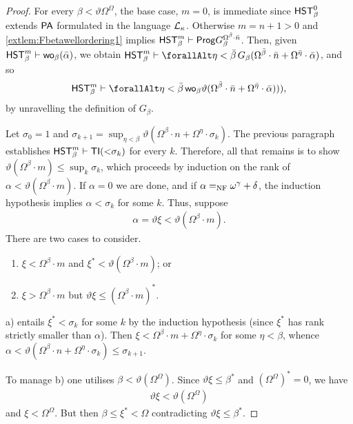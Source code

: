 \documentclass[UKenglish,cleveref,DIV=12]{scrartcl}
\let\forall\forallAlt
\theoremstyle{definition}
\theoremstyle{definition}
\begin{document}
\begin{proof}
For every $\beta<\vartheta\Omega^\Omega$, the base case, $m=0$, is immediate
since $\mathsf{HST}_\beta^0$ extends $\mathsf{PA}$ formulated in the language $\mathcal{L}_\kappa$.
Otherwise $m=n+1>0$ and \cref{extlem:Fbetawellordering1} implies $\mathsf{HST}_\beta^m\vdash\mathsf{Prog}
G_\beta^{\Omega^{\bar\beta}\cdot\bar n}$. Then, given $\mathsf{HST}_\beta^m\vdash
\mathsf{wo}_\beta(\bar \alpha)$, we obtain $\HST_\beta^m\proves
\forall\eta<\bar\beta\,G_\beta(\Omega^{\bar\beta}\cdot\bar
n+\Omega^{\bar\eta}\cdot\bar\alpha)$, and so
\begin{align*}
  \HST_\beta^m\proves\forall\eta<\bar\beta\,\wo_\beta\vartheta(\Omega^{\bar \beta}\cdot\bar
  n+\Omega^{\bar \eta}\cdot\bar\alpha))),
\end{align*}
by unravelling the definition of $G_\beta$.

Let $\sigma_0=1$ and $\sigma_{k+1}=\sup_{\eta<\beta}\vartheta(\Omega^{\beta}\cdot
n+\Omega^\eta\cdot\sigma_k)$. The previous paragraph establishes $\mathsf{HST}_\beta^m\vdash
\mathsf{TI}(\mathord<\sigma_k)$ for every $k$. Therefore, all that remains is to show
$\vartheta(\Omega^{\beta}\cdot m)\le\sup_k\sigma_k$, which proceeds by induction
on the rank of $\alpha<\vartheta(\Omega^{\beta}\cdot m)$. If $\alpha=0$ we are
done, and if $\alpha=_{\mathrm{NF}}\omega^\gamma+\delta$, the induction hypothesis implies
$\alpha<\sigma_k$ for some $k$. Thus, suppose
\begin{gather*}
  \alpha=\vartheta\xi<\vartheta(\Omega^{\beta}\cdot m).
\end{gather*}
There are two cases to consider.
\begin{enumerate}
 \item $\xi<\Omega^{\beta}\cdot m$ and $\xi^*<\vartheta(\Omega^{\beta}\cdot m)$; or
 \item $\xi>\Omega^{\beta}\cdot m$ but $\vartheta\xi\le(\Omega^{\beta}\cdot m)^*$.
\end{enumerate}
a) entails $\xi^*<\sigma_k$ for some $k$ by the induction hypothesis
(since $\xi^*$ has rank strictly smaller than $\alpha$). Then
$\xi<\Omega^{\beta}\cdot m+\Omega^\eta\cdot\sigma_k$ for some $\eta<\beta$, whence
$\alpha<\vartheta(\Omega^{\beta}\cdot n+\Omega^\eta\cdot\sigma_k)\le\sigma_{k+1}$.

To manage b) one utilises $\beta<\vartheta(\Omega^\Omega)$. Since
$\vartheta\xi\le\beta^*$ and $(\Omega^\Omega)^*=0$, we have
\begin{align*}
  \vartheta\xi<\vartheta(\Omega^\Omega)
\end{align*}
and $\xi<\Omega^\Omega$. %
But then $\beta\le\xi^*<\Omega$
contradicting $\vartheta\xi\le\beta^*$.


\end{proof}
\end{document}
